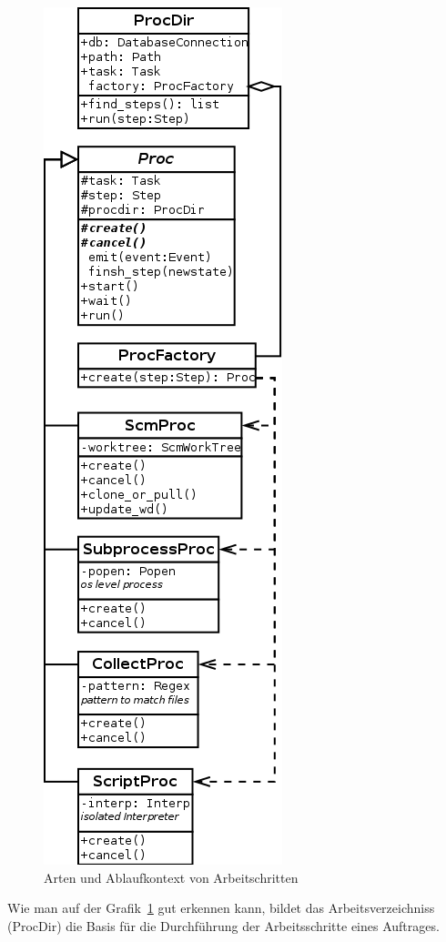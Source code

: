 \begin{figure}[h!]
  \centering
  \label{fig:klassen-arten-arbeitsschritt}
  \includegraphics[height=\textheight]{imageinput/klassen-arten-arbeitsschritt.png}
  \caption{Arten und Ablaufkontext von Arbeitschritten}
\end{figure}

Wie man auf der Grafik~\ref{fig:klassen-arten-arbeitsschritt} gut erkennen kann,
bildet das Arbeitsverzeichniss (ProcDir) die Basis
f\"ur die Durchf\"uhrung der Arbeitsschritte eines Auftrages.

